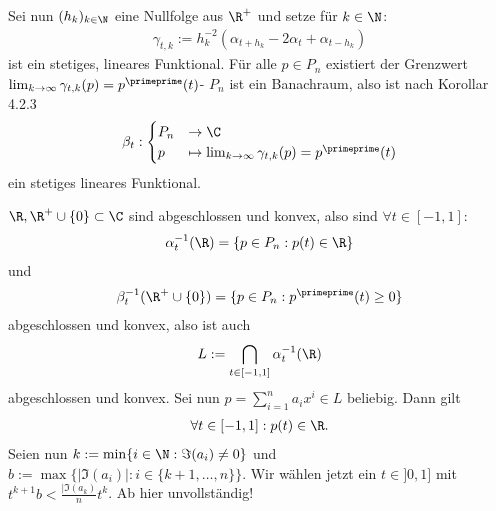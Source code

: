 \begin{solution}
\begin{itemize}
  Sei nun $(h_k)_{k \in \N}$ eine Nullfolge aus $\R^+$ und setze für $k \in \N$:
  \begin{align*}
    \gamma_{t,k} := h_k^{-2}(\alpha_{t + h_k} - 2\alpha_t + \alpha_{t - h_k})
  \end{align*}
  ist ein stetiges, lineares Funktional.
  Für alle $p \in P_n$ existiert der Grenzwert $\lim_{k \to \infty}\gamma_{t,k}(p) = p^{\primeprime}(t)$-
  $P_n$ ist ein Banachraum, also ist nach Korollar 4.2.3
  \begin{align*}
    \beta_t: \begin{cases}
      P_n &\to \C \\
      p &\mapsto \lim_{k \to \infty}\gamma_{t,k}(p) = p^{\primeprime}(t)
    \end{cases}
  \end{align*}
  ein stetiges lineares Funktional.
\end{itemize}
$\R, \R^+ \cup \{0\} \subset \C$ sind abgeschlossen und konvex, also sind $\forall t \in [-1,1]$:
\begin{align*}
  \alpha_t^{-1}(\R) = \{p \in P_n: p(t) \in \R\}
\end{align*}
und
\begin{align*}
  \beta_t^{-1}(\R^+ \cup \{0\}) = \{p \in P_n: p^{\primeprime}(t) \geq 0\}
\end{align*}
abgeschlossen und konvex, also ist auch
\begin{align*}
  L := \bigcap_{t \in [-1,1]}\alpha_t^{-1}(\R)
\end{align*}
abgeschlossen und konvex. Sei nun $p = \sum_{i = 1}^n a_i x^i \in L$ beliebig.
Dann gilt
\begin{align*}
  \forall t \in [-1,1]: p(t) \in \R.
\end{align*}
Seien nun $k := \min \{ i \in \N: \Im(a_i) \neq 0\}$
und $b := \max\{|\Im(a_i)|: i \in \{k+1,\dots,n\}\}$.
Wir wählen jetzt ein $t \in ]0,1]$ mit $t^{k+1}b < \frac{|\Im(a_k)}{n}t^k$.
Ab hier unvollständig!
\end{solution}
